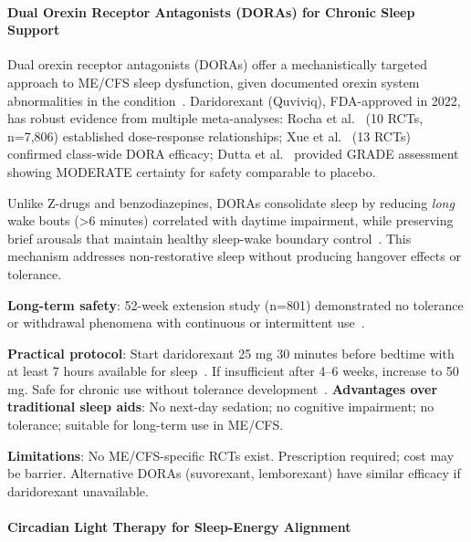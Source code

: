 \paragraph{Dual Orexin Receptor Antagonists (DORAs) for Chronic Sleep Support}

\begin{achievement}
\label{achievement:daridorexant-efficacy}
Dual orexin receptor antagonists (DORAs) offer a mechanistically targeted approach to ME/CFS sleep dysfunction, given documented orexin system abnormalities in the condition~\cite{LopezAmador2025orexin}. Daridorexant (Quviviq), FDA-approved in 2022, has robust evidence from multiple meta-analyses: Rocha et al.~\cite{Rocha2023dora} (10 RCTs, n=7,806) established dose-response relationships; Xue et al.~\cite{Xue2022dora} (13 RCTs) confirmed class-wide DORA efficacy; Dutta et al.~\cite{Dutta2023daridorexant} provided GRADE assessment showing MODERATE certainty for safety comparable to placebo.

Unlike Z-drugs and benzodiazepines, DORAs consolidate sleep by reducing \emph{long} wake bouts (>6 minutes) correlated with daytime impairment, while preserving brief arousals that maintain healthy sleep-wake boundary control~\cite{DiMarco2023wakebouts}. This mechanism addresses non-restorative sleep without producing hangover effects or tolerance.

\textbf{Long-term safety}: 52-week extension study (n=801) demonstrated no tolerance or withdrawal phenomena with continuous or intermittent use~\cite{Kunz2022daridorexant}.
\end{achievement}

\textbf{Practical protocol}: Start daridorexant 25 mg 30 minutes before bedtime with at least 7 hours available for sleep~\cite{Nie2023daridorexant}. If insufficient after 4--6 weeks, increase to 50 mg. Safe for chronic use without tolerance development~\cite{StOnge2022daridorexant}. \textbf{Advantages over traditional sleep aids}: No next-day sedation; no cognitive impairment; no tolerance; suitable for long-term use in ME/CFS.

\textbf{Limitations}: No ME/CFS-specific RCTs exist. Prescription required; cost may be barrier. Alternative DORAs (suvorexant, lemborexant) have similar efficacy if daridorexant unavailable.

\paragraph{Circadian Light Therapy for Sleep-Energy Alignment}

